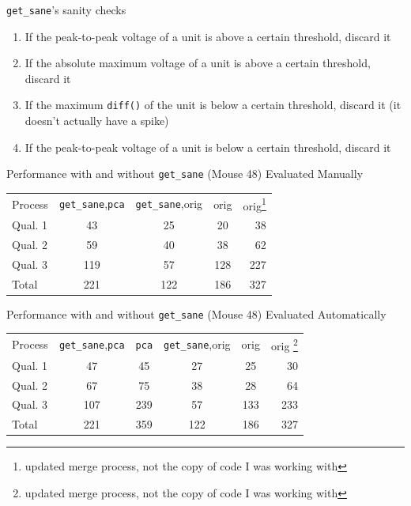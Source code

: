 \documentclass{beamer}
\begin{document}
    \begin{frame}{\texttt{get\_sane}'s sanity checks}
        \begin{enumerate}
            \pause
            \item If the peak-to-peak voltage of a unit is above a certain
threshold, discard it
            \pause
            \item If the absolute maximum voltage of a unit is above a certain
threshold, discard it 
            \pause
            \item If the maximum \texttt{diff()} of the unit is below a certain
threshold, discard it (it doesn't actually have a spike)
            \pause
            \item If the peak-to-peak voltage of a unit is below a certain
threshold, discard it
         \end{enumerate}
    \end{frame}

    \begin{frame}{Performance with and without \texttt{get\_sane} (Mouse 48)
Evaluated Manually}
        \begin{tabular}{l c c c r}
        \pause
        Process&\texttt{get\_sane},\texttt{pca}&\texttt{get\_sane},orig&orig&orig\footnote{updated
merge process, not the copy of code I was working with}\\
        \pause
        Qual. 1&43&25&20&38\\
        Qual. 2&59&40&38&62\\
        Qual. 3&119&57&128&227\\
        Total&221&122&186&327
        \end{tabular}
    \end{frame}

    \begin{frame}{Performance with and without \texttt{get\_sane} (Mouse 48)
Evaluated Automatically}
        \begin{tabular}{l c c c c r}
        \pause
        Process&\texttt{get\_sane},\texttt{pca}&\texttt{pca}&\texttt{get\_sane},orig&orig&orig
\footnote{updated
merge process, not the copy of code I was working with}\\
        \pause
        Qual. 1&47&45&27&25&30\\
        Qual. 2&67&75&38&28&64\\
        Qual. 3&107&239&57&133&233\\
        Total&221&359&122&186&327\\
        \end{tabular}
    \end{frame} 
\end{document}
